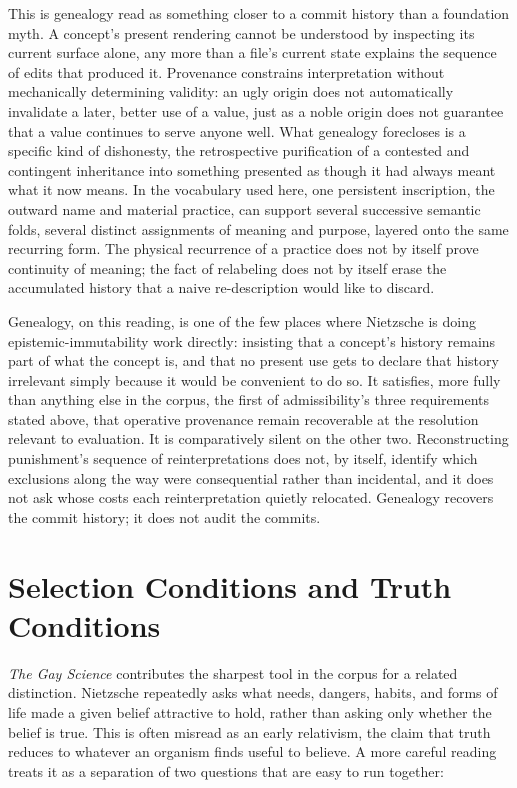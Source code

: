 \documentclass[11pt]{article}
\begin{document}
This is genealogy read as something closer to a commit history than a foundation myth. A concept's present rendering cannot be understood by inspecting its current surface alone, any more than a file's current state explains the sequence of edits that produced it. Provenance constrains interpretation without mechanically determining validity: an ugly origin does not automatically invalidate a later, better use of a value, just as a noble origin does not guarantee that a value continues to serve anyone well. What genealogy forecloses is a specific kind of dishonesty, the retrospective purification of a contested and contingent inheritance into something presented as though it had always meant what it now means. In the vocabulary used here, one persistent inscription, the outward name and material practice, can support several successive semantic folds, several distinct assignments of meaning and purpose, layered onto the same recurring form. The physical recurrence of a practice does not by itself prove continuity of meaning; the fact of relabeling does not by itself erase the accumulated history that a naive re-description would like to discard.

Genealogy, on this reading, is one of the few places where Nietzsche is doing epistemic-immutability work directly: insisting that a concept's history remains part of what the concept is, and that no present use gets to declare that history irrelevant simply because it would be convenient to do so. It satisfies, more fully than anything else in the corpus, the first of admissibility's three requirements stated above, that operative provenance remain recoverable at the resolution relevant to evaluation. It is comparatively silent on the other two. Reconstructing punishment's sequence of reinterpretations does not, by itself, identify which exclusions along the way were consequential rather than incidental, and it does not ask whose costs each reinterpretation quietly relocated. Genealogy recovers the commit history; it does not audit the commits.

\section*{Selection Conditions and Truth Conditions}

\emph{The Gay Science} contributes the sharpest tool in the corpus for a related distinction. Nietzsche repeatedly asks what needs, dangers, habits, and forms of life made a given belief attractive to hold, rather than asking only whether the belief is true. This is often misread as an early relativism, the claim that truth reduces to whatever an organism finds useful to believe. A more careful reading treats it as a separation of two questions that are easy to run together:
\end{document}
